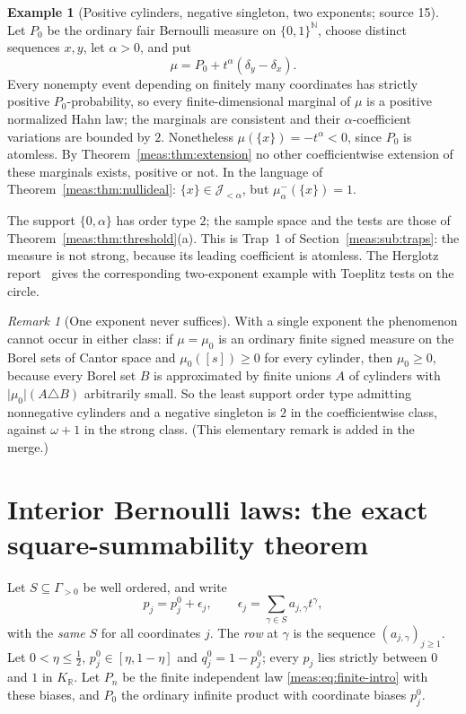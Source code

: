 \documentclass[11pt]{article}
\numberwithin{equation}{section}
\theoremstyle{definition}
\newtheorem{example}[theorem]{Example}
\theoremstyle{remark}
\newtheorem{remark}[theorem]{Remark}
\newcommand{\R}{\mathbb R}
\newcommand{\N}{\mathbb N}
\newcommand{\KR}{K_{\R}}
\newcommand{\abs}[1]{\lvert#1\rvert}
\begin{document}
\begin{example}[Positive cylinders, negative singleton, two exponents;
source 15]\label{meas:ex:negative}
Let $P_0$ be the ordinary fair Bernoulli measure on $\{0,1\}^{\N}$, choose distinct
sequences $x,y$, let $\alpha>0$, and put
\begin{equation}\label{meas:eq:bad-positive}
 \mu=P_0+t^\alpha(\delta_y-\delta_x).
\end{equation}
Every nonempty event depending on finitely many coordinates has strictly
positive $P_0$-probability, so every finite-dimensional marginal of $\mu$ is a
positive normalized Hahn law; the marginals are consistent and their
$\alpha$-coefficient variations are bounded by $2$. Nonetheless
$\mu(\{x\})=-t^\alpha<0$, since $P_0$ is atomless. By
Theorem~\ref{meas:thm:extension} no other coefficientwise extension of these
marginals exists, positive or not. In the language of
Theorem~\ref{meas:thm:nullideal}: $\{x\}\in\mathcal J_{<\alpha}$, but
$\mu_\alpha^-(\{x\})=1$.
\end{example}

The support $\{0,\alpha\}$ has order type $2$; the sample space and the tests are
those of Theorem~\ref{meas:thm:threshold}(a). This is Trap~1 of
Section~\ref{meas:sub:traps}: the measure is not strong, because its leading
coefficient is atomless. The Herglotz report~\cite{repoherg} gives the
corresponding two-exponent example with Toeplitz tests on the circle.

\begin{remark}[One exponent never suffices]\label{meas:rem:one-exponent}
With a single exponent the phenomenon cannot occur in either class: if
$\mu=\mu_0$ is an ordinary finite signed measure on the Borel sets of Cantor space
and $\mu_0([s])\ge0$ for every cylinder, then $\mu_0\ge0$, because every Borel
set $B$ is approximated by finite unions $A$ of cylinders with
$\abs{\mu_0}(A\triangle B)$ arbitrarily small. So the least support order type
admitting nonnegative cylinders and a negative singleton is $2$ in the
coefficientwise class, against $\omega+1$ in the strong class. (This elementary
remark is added in the merge.)
\end{remark}

\section{Interior Bernoulli laws: the exact square-summability theorem}
\label{meas:sec:interior}

Let $S\subseteq\Gamma_{>0}$ be well ordered, and write
\begin{equation}\label{meas:eq:perturbation}
 p_j=p_j^0+\epsilon_j,\qquad \epsilon_j=\sum_{\gamma\in S}a_{j,\gamma}t^\gamma,
\end{equation}
with the \emph{same} $S$ for all coordinates $j$. The \emph{row} at $\gamma$ is the
sequence $(a_{j,\gamma})_{j\ge1}$. Let $0<\eta\le\frac12$, $p_j^0\in[\eta,1-\eta]$ and
$q_j^0=1-p_j^0$; every $p_j$ lies strictly between $0$ and $1$ in $\KR$. Let $P_n$
be the finite independent law \eqref{meas:eq:finite-intro} with these biases, and
$P_0$ the ordinary infinite product with coordinate biases $p_j^0$.
\end{document}
